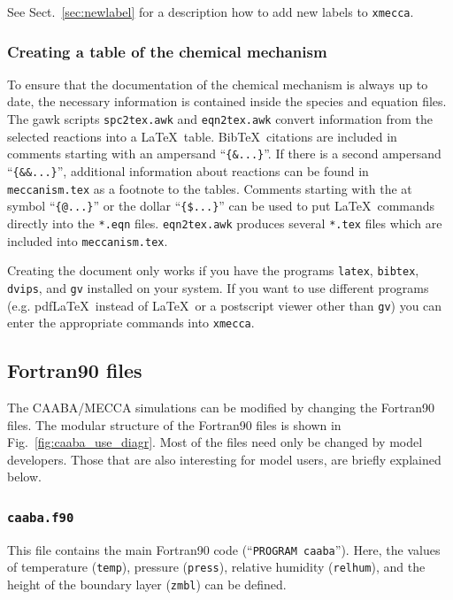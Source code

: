 \documentclass[twoside]{article}
\begin{document}
See Sect.~\ref{sec:newlabel} for a description how to add new labels to
\verb|xmecca|.

\subsubsection{Creating a table of the chemical mechanism}
\label{sec:latextable}

To ensure that the documentation of the chemical mechanism is always up
to date, the necessary information is contained inside the species and
equation files. The gawk scripts \verb|spc2tex.awk| and
\verb|eqn2tex.awk| convert information from the selected reactions into
a La\TeX\ table. Bib\TeX\ citations are included in comments starting
with an ampersand ``\verb|{&...}|''. If there is a second ampersand
``\verb|{&&...}|'', additional information about reactions can be found
in \verb|meccanism.tex| as a footnote to the tables. Comments starting
with the at symbol ``\verb|{@...}|'' or the dollar ``\verb|{$...}|'' can
be used to put La\TeX\ commands directly into the \verb|*.eqn| files.
\verb|eqn2tex.awk| produces several \verb|*.tex| files which are
included into \verb|meccanism.tex|.

Creating the document only works if you have the programs \verb|latex|,
\verb|bibtex|, \verb|dvips|, and \verb|gv| installed on your system. If
you want to use different programs (e.g. pdf\LaTeX\ instead of \LaTeX\ 
or a postscript viewer other than \verb|gv|) you can enter the
appropriate commands into \verb|xmecca|.

\subsection{Fortran90 files}
\label{sec:f90files}

The CAABA/MECCA simulations can be modified by changing the Fortran90
files. The modular structure of the Fortran90 files is shown in
Fig.~\ref{fig:caaba_use_diagr}. Most of the files need only be changed
by model developers. Those that are also interesting for model users,
are briefly explained below.

\subsubsection{{\tt caaba.f90}}

This file contains the main Fortran90 code (``\verb|PROGRAM caaba|'').
Here, the values of temperature (\verb|temp|), pressure (\verb|press|),
relative humidity (\verb|relhum|), and the height of the boundary layer
(\verb|zmbl|) can be defined.
\end{document}
